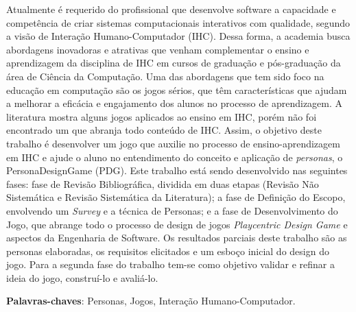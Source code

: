 \begin{resumo}

Atualmente é requerido do profissional que desenvolve software a capacidade e competência de criar sistemas computacionais interativos com qualidade, segundo a visão de Interação Humano-Computador (IHC). Dessa forma, a academia busca abordagens inovadoras e atrativas que venham complementar o ensino e aprendizagem da disciplina de IHC em cursos de graduação e pós-graduação da área de Ciência da Computação. Uma das abordagens que tem sido foco na educação em computação são os jogos sérios, que têm características que ajudam a melhorar a eficácia e engajamento dos alunos no processo de aprendizagem. A literatura mostra alguns jogos aplicados ao ensino em IHC, porém não foi encontrado um que abranja todo conteúdo de IHC. Assim, o objetivo deste trabalho é desenvolver um jogo que auxilie no processo de ensino-aprendizagem em IHC e ajude o aluno no entendimento do conceito e aplicação de \textit{personas}, o PersonaDesignGame (PDG). Este trabalho está sendo desenvolvido nas seguintes fases: fase de Revisão Bibliográfica, dividida em duas etapas (Revisão Não Sistemática e Revisão Sistemática da Literatura); a fase de Definição do Escopo, envolvendo um \textit{Survey} e a técnica de Personas; e a fase de Desenvolvimento do Jogo, que abrange todo o processo de design de jogos \textit{Playcentric Design Game} e aspectos da Engenharia de Software. Os resultados parciais deste trabalho são as personas elaboradas, os requisitos elicitados e um esboço inicial do design do jogo. Para a segunda fase do trabalho tem-se como objetivo validar e refinar a ideia do jogo, construí-lo e avaliá-lo.



 \vspace{\onelineskip}
    
 \noindent
 \textbf{Palavras-chaves}: Personas, Jogos, Interação Humano-Computador.
\end{resumo}
